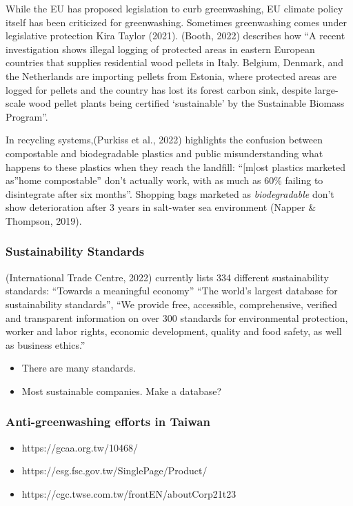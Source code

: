 \documentclass[
  letterpaper,
  DIV=11,
  numbers=noendperiod]{scrartcl}
\providecommand{\tightlist}{%
  \setlength{\itemsep}{0pt}\setlength{\parskip}{0pt}}\usepackage{longtable,booktabs,array}
\begin{document}
While the EU has proposed legislation to curb greenwashing, EU climate
policy itself has been criticized for greenwashing. Sometimes
greenwashing comes under legislative protection Kira Taylor (2021).
(Booth, 2022) describes how ``A recent investigation shows illegal
logging of protected areas in eastern European countries that supplies
residential wood pellets in Italy. Belgium, Denmark, and the Netherlands
are importing pellets from Estonia, where protected areas are logged for
pellets and the country has lost its forest carbon sink, despite
large-scale wood pellet plants being certified `sustainable' by the
Sustainable Biomass Program''.

In recycling systems,(Purkiss et al., 2022) highlights the confusion
between compostable and biodegradable plastics and public
misunderstanding what happens to these plastics when they reach the
landfill: ``{[}m{]}ost plastics marketed as''home compostable'' don't
actually work, with as much as 60\% failing to disintegrate after six
months''. Shopping bags marketed as \emph{biodegradable} don't show
deterioration after 3 years in salt-water sea environment (Napper \&
Thompson, 2019).

\subsubsection{Sustainability Standards}\label{sustainability-standards}

(International Trade Centre, 2022) currently lists 334 different
sustainability standards: ``Towards a meaningful economy'' ``The world's
largest database for sustainability standards'', ``We provide free,
accessible, comprehensive, verified and transparent information on over
300 standards for environmental protection, worker and labor rights,
economic development, quality and food safety, as well as business
ethics.''

\begin{itemize}
\item
  There are many standards.
\item
  Most sustainable companies. Make a database?
\end{itemize}

\subsubsection{Anti-greenwashing efforts in
Taiwan}\label{anti-greenwashing-efforts-in-taiwan}

\begin{itemize}
\tightlist
\item
  https://gcaa.org.tw/10468/
\item
  https://esg.fsc.gov.tw/SinglePage/Product/
\item
  https://cgc.twse.com.tw/frontEN/aboutCorp21t23
\end{itemize}
\end{document}
